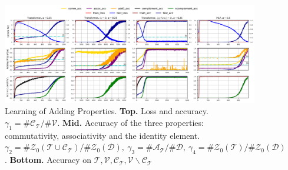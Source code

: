 \documentclass{article}
\begin{document}
\begin{figure}[htbp]
  \centering
  \includegraphics[width=\textwidth]{./pic/add.png}
  \caption{Learning of Adding Properties. \textbf{Top.} Loss and accuracy. $\gamma_1 = \#\mathcal{C_T} /\#\mathcal{V}$. \textbf{Mid.} Accuracy of the three properties: commutativity, associativity and the identity element. $\gamma_2 = \#\mathcal{Z}_0(\mathcal{T}\cup\mathcal{C_T}) / \#\mathcal{Z}_0(\mathcal{D}),\ \gamma_3 = \#\mathcal{A_T}/\#\mathcal{D},\ \gamma_4 = \#\mathcal{Z}_0(\mathcal{T})/\#\mathcal{Z}_0(\mathcal{D})$. \textbf{Bottom.} Accuracy on $\mathcal{T}, \mathcal{V}, \mathcal{C_T}, \mathcal{V}\backslash\mathcal{C_T}$}
  \label{adding}
\end{figure}
\end{document}
